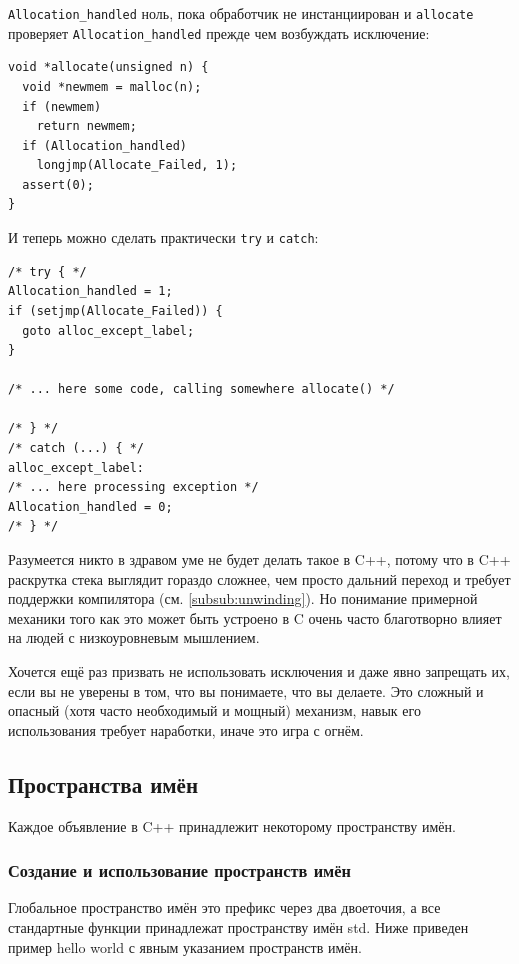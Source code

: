 \documentclass[a4paper,12pt,oneside]{article}
\begin{document}
\lstinline!Allocation_handled! ноль, пока обработчик не инстанциирован и \lstinline!allocate! проверяет \lstinline!Allocation_handled! прежде чем возбуждать исключение:

\begin{lstlisting}
void *allocate(unsigned n) {
  void *newmem = malloc(n);
  if (newmem)
    return newmem;
  if (Allocation_handled)
    longjmp(Allocate_Failed, 1);
  assert(0);
}
\end{lstlisting}

И теперь можно сделать практически \lstinline!try! и \lstinline!catch!:

\begin{lstlisting}
/* try { */
Allocation_handled = 1;
if (setjmp(Allocate_Failed)) {
  goto alloc_except_label;
}

/* ... here some code, calling somewhere allocate() */

/* } */
/* catch (...) { */
alloc_except_label:
/* ... here processing exception */
Allocation_handled = 0;
/* } */
\end{lstlisting}

Разумеется никто в здравом уме не будет делать такое в C++, потому что в C++ раскрутка стека выглядит гораздо сложнее, чем просто дальний переход и требует поддержки компилятора (см. \ref{subsub:unwinding}). Но понимание примерной механики того как это может быть устроено в C очень часто благотворно влияет на людей с низкоуровневым мышлением.

Хочется ещё раз призвать не использовать исключения и даже явно запрещать их, если вы не уверены в том, что вы понимаете, что вы делаете. Это сложный и опасный (хотя часто необходимый и мощный) механизм, навык его использования требует наработки, иначе это игра с огнём.

\pagebreak
\subsection{Пространства имён}\label{Namespaces}

Каждое объявление в C++ принадлежит некоторому пространству имён. 

\subsubsection{Создание и использование пространств имён}

Глобальное пространство имён это префикс через два двоеточия, а все стандартные функции принадлежат пространству имён std. Ниже приведен пример hello world с явным указанием пространств имён.
\end{document}
